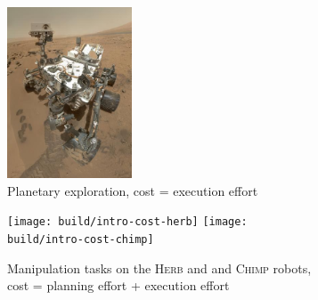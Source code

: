 {
\setlength{\offsetpage}{1.2in}
\begin{figure}[t]
\begin{widepage}
\begin{center}
   \begin{subfigure}[b]{1.6in}
      \begin{center}
      \includegraphics[height=2in]{figs/curiosity-rover.png}
      \end{center}
      \caption{Planetary exploration\footnotemark,
         cost = execution effort}
   \end{subfigure}
   \begin{subfigure}[b]{3.5in}
      \begin{center}
      \texttt{[image: build/intro-cost-herb]}
      \texttt{[image: build/intro-cost-chimp]}
      \end{center}
      \caption{Manipulation tasks on the \textsc{Herb} and 
         and \textsc{Chimp} robots,\\
         cost = planning effort + execution effort}
   \end{subfigure}%
   \quad%
   \begin{subfigure}[b]{1.8in}
\end{subfigure}
\end{center}
\end{widepage}
\end{figure}}
